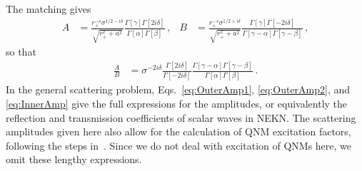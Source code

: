 \begin{refsection}
The matching gives 
\begin{align}
\label{eq:InnerAmp}
A & = \frac{r_+^{-s}\sigma^{1/2 - i \delta}}{\sqrt{r_+^2 + a^2}} \frac{\Gamma[\gamma] \Gamma[2 i \delta]}{\Gamma[\alpha] \Gamma[\beta]}\,, &
B & = \frac{r_+^{-s}\sigma^{1/2 + i \delta}}{\sqrt{r_+^2 + a^2}} \frac{\Gamma[\gamma] \Gamma[-2i\delta]}{\Gamma[\gamma - \alpha] \Gamma[\gamma - \beta]} \,,
\end{align}
so that 
\begin{align}
\label{eq:Ratio2}
\frac{A}{B} & = \sigma^{- 2 i \delta} \frac{\Gamma[2i\delta]}{\Gamma[-2 i \delta]}\frac{\Gamma[\gamma - \alpha]\Gamma[\gamma - \beta]}{\Gamma[\alpha]\Gamma[\beta]} \,.
\end{align}
In the general scattering problem, Eqs.~\eqref{eq:OuterAmp1}, \eqref{eq:OuterAmp2}, and \eqref{eq:InnerAmp} give the full expressions for the amplitudes, or equivalently the reflection and transmission coefficients of scalar waves in NEKN. 
The scattering amplitudes given here also allow for the calculation of QNM excitation factors, following the steps in~\cite{Yang:2013uba}. 
Since we do not deal with excitation of QNMs here, we omit these lengthy expressions.


\end{refsection}
